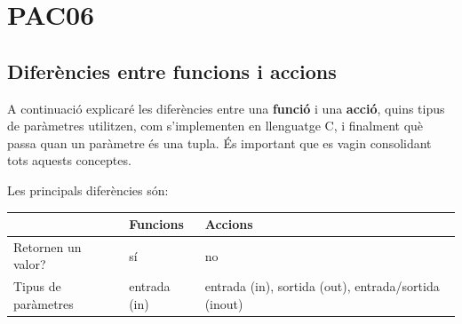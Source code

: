 \documentclass[]{book}
\begin{document}
\chapter{PAC06}\label{pac06}

\section{Diferències entre funcions i
accions}\label{diferencies-entre-funcions-i-accions}

A continuació explicaré les diferències entre una \textbf{funció} i una
\textbf{acció}, quins tipus de paràmetres utilitzen, com s'implementen
en llenguatge C, i finalment què passa quan un paràmetre és una tupla.
És important que es vagin consolidant tots aquests conceptes.

Les principals diferències són:

\begin{longtable}[]{@{}lll@{}}
\toprule
\begin{minipage}[b]{0.24\columnwidth}\raggedright\strut
\strut
\end{minipage} & \begin{minipage}[b]{0.11\columnwidth}\raggedright\strut
Funcions\strut
\end{minipage} & \begin{minipage}[b]{0.10\columnwidth}\raggedright\strut
Accions\strut
\end{minipage}\tabularnewline
\midrule
\endhead
\begin{minipage}[t]{0.24\columnwidth}\raggedright\strut
Retornen un valor?\strut
\end{minipage} & \begin{minipage}[t]{0.11\columnwidth}\raggedright\strut
sí\strut
\end{minipage} & \begin{minipage}[t]{0.10\columnwidth}\raggedright\strut
no\strut
\end{minipage}\tabularnewline
\begin{minipage}[t]{0.24\columnwidth}\raggedright\strut
Tipus de paràmetres\strut
\end{minipage} & \begin{minipage}[t]{0.11\columnwidth}\raggedright\strut
entrada (in)\strut
\end{minipage} & \begin{minipage}[t]{0.10\columnwidth}\raggedright\strut
entrada (in), sortida (out), entrada/sortida (inout)\strut
\end{minipage}\tabularnewline
\bottomrule
\end{longtable}
\end{document}
